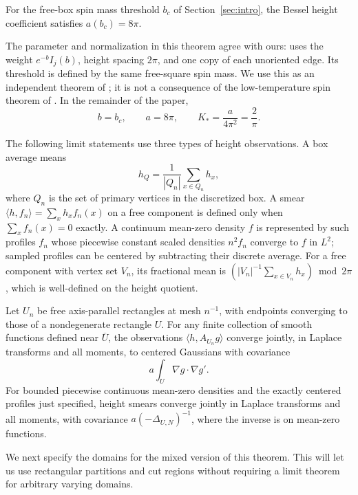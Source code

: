 \begin{theorem}
\label{heights:critical-input}
For the free-box spin mass threshold \(b_c\) of Section~\ref{sec:intro},
the Bessel height coefficient satisfies \(a(b_c)=8\pi\).
\end{theorem}

The parameter and normalization in this theorem agree with ours:
\cite{C} uses the weight \(e^{-b}I_j(b)\), height spacing \(2\pi\),
and one copy of each unoriented edge. Its threshold is defined by the
same free-square spin mass. We use this as an independent theorem of
\cite{C}; it is not a consequence of the low-temperature spin theorem
of \cite{B}. In the remainder of the paper,
\[
                     b=b_c,\qquad a=8\pi,\qquad
                     K_*=\frac{a}{4\pi^2}=\frac2\pi.
\]

The following limit statements use three types of height observations.
A box average means
\[
                  h_Q=\frac1{|Q_n|}\sum_{x\in Q_n}h_x,
\]
where \(Q_n\) is the set of primary vertices in the discretized box.
A smear \(\langle h,f_n\rangle=\sum_xh_xf_n(x)\) on a free component
is defined only when \(\sum_xf_n(x)=0\) exactly. A continuum
mean-zero density \(f\) is represented by such profiles \(f_n\)
whose piecewise constant scaled densities \(n^2f_n\) converge to
\(f\) in \(L^2\); sampled profiles can be centered by subtracting
their discrete average.
For a free component with vertex set \(V_n\), its fractional mean is
\((|V_n|^{-1}\sum_{x\in V_n}h_x)\bmod 2\pi\), which is well-defined
on the height quotient.

\begin{theorem}
\label{heights:free-input}
Let \(U_n\) be free axis-parallel rectangles at mesh \(n^{-1}\), with
endpoints converging to those of a nondegenerate rectangle \(U\).
For any finite collection of smooth functions defined near
\(\overline U\), the observations
\(\langle h,A_{U_n}g\rangle\) converge jointly, in Laplace transforms
and all moments, to centered Gaussians with covariance
\[
                  a\int_U\nabla g\cdot\nabla g'.
\]
For bounded piecewise continuous mean-zero densities and the exactly
centered profiles just specified, height smears converge jointly in
Laplace transforms and all moments, with covariance
\(a(-\Delta_{U,N})^{-1}\), where the inverse is on mean-zero functions.
\end{theorem}

We next specify the domains for the mixed version of this theorem.
This will let us use rectangular partitions and cut regions without
requiring a limit theorem for arbitrary varying domains.

